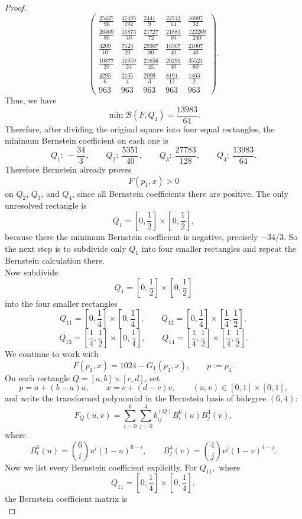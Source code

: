 \documentclass[10pt,a4paper]{amsart}
\begin{document}
\begin{proof}
\[\begin{pmatrix}
	\frac{25427}{96} & \frac{47495}{192} & \frac{2441}{9} & \frac{22743}{64} & \frac{16807}{32}\\[5mm]
	\frac{26469}{80} & \frac{11873}{40} & \frac{21727}{72} & \frac{21883}{60} & \frac{122269}{240}\\[5mm]
	\frac{4209}{10} & \frac{7523}{20} & \frac{29307}{80} & \frac{16367}{40} & \frac{21007}{40}\\[5mm]
	\frac{10877}{20} & \frac{11959}{24} & \frac{21656}{45} & \frac{20291}{40} & \frac{35521}{60}\\[5mm]
	\frac{4295}{6} & \frac{2735}{4} & \frac{2009}{3} & \frac{8191}{12} & \frac{1463}{2}\\[5mm]
	963 & 963 & 963 & 963 & 963
\end{pmatrix}.
\]
Thus, we have 
\[
\min \mathcal B(F,Q_4)=\frac{13983}{64}.
\]
Therefore, after dividing the original square into four equal rectangles, the minimum Bernstein coefficient on each one is
\[
Q_1:\ -\frac{34}{3},\qquad
Q_2:\ \frac{5351}{40},\qquad
Q_3:\ \frac{27783}{128},\qquad
Q_4:\ \frac{13983}{64}.
\]
Therefore Bernstein already proves
\[
F(p_1,x)>0
\]
on \(Q_2\), \(Q_3\), and \(Q_4\), since all Bernstein coefficients there are positive.
The only unresolved rectangle is
\[
Q_1=\left[0,\frac12\right]\times\left[0,\frac12\right],
\]
because there the minimum Bernstein coefficient is negative, precisely
$
-{34}/{3}.
$
So the next step is to subdivide only \(Q_1\) into four smaller rectangles and repeat the Bernstein calculation there.\\[2mm]
Now subdivide
\[
Q_1=\left[0,\frac12\right]\times\left[0,\frac12\right]
\]
into the four smaller rectangles
\[
Q_{11}=\left[0,\frac14\right]\times\left[0,\frac14\right],\qquad
Q_{12}=\left[0,\frac14\right]\times\left[\frac14,\frac12\right],
\]
\[
Q_{13}=\left[\frac14,\frac12\right]\times\left[0,\frac14\right],\qquad
Q_{14}=\left[\frac14,\frac12\right]\times\left[\frac14,\frac12\right].
\]
We continue to work with
\[
F(p_1,x)=1024-G_1(p_1,x),
\qquad p:=p_1.
\]
On each rectangle \(Q=[a,b]\times[c,d]\), set
\[
p=a+(b-a)u,\qquad x=c+(d-c)v,\qquad (u,v)\in[0,1]\times[0, 1],
\]
and write the transformed polynomial in the Bernstein basis of bidegree \((6,4)\):
\[
F_Q(u,v)=\sum_{i=0}^{6}\sum_{j=0}^{4} b^{(Q)}_{ij} B_i^6(u)B_j^4(v),
\]
where
\[
B_i^6(u)=\binom{6}{i}u^i(1-u)^{6-i},
\qquad
B_j^4(v)=\binom{4}{j}v^j(1-v)^{4-j}.
\]
Now we list every Bernstein coefficient explicitly.
For $Q_{11},$ where
\[
Q_{11}=\left[0,\frac14\right]\times\left[0,\frac14\right],
\]
the Bernstein coefficient matrix is\\

\end{proof}
\end{document}
